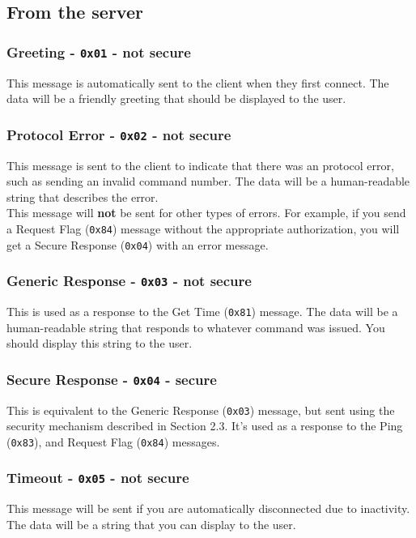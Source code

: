 \documentclass{report}
\newcommand{\code}[1]{\texttt{#1}}
\begin{document}
\subsection{From the server}
\subsubsection{Greeting - \code{0x01} - not secure}
This message is automatically sent to the client when they first connect.
The data will be a friendly greeting that should be displayed to the user.

\subsubsection{Protocol Error - \code{0x02} - not secure}
This message is sent to the client to indicate that there was an protocol error, such as sending an invalid command number.
The data will be a human-readable string that describes the error. \\
This message will \textbf{not} be sent for other types of errors.
For example, if you send a Request Flag (\code{0x84}) message without the appropriate authorization, you will get a Secure Response (\code{0x04}) with an error message.

\subsubsection{Generic Response - \code{0x03} - not secure}
This is used as a response to the Get Time (\code{0x81}) message.
The data will be a human-readable string that responds to whatever command was issued. You should display this string to the user.

\subsubsection{Secure Response - \code{0x04} - secure}
This is equivalent to the Generic Response (\code{0x03}) message, but sent using the security mechanism described in Section 2.3.
It's used as a response to the Ping (\code{0x83}), and Request Flag (\code{0x84}) messages.

\subsubsection{Timeout - \code{0x05} - not secure}
This message will be sent if you are automatically disconnected due to inactivity. The data will be a string that you can display to the user.
\end{document}
